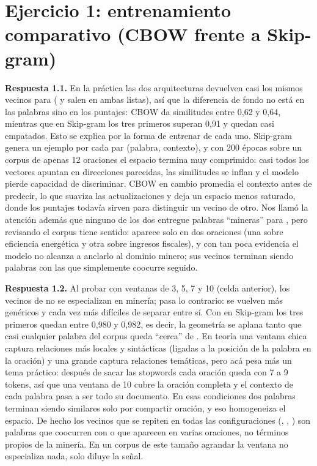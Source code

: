 \section{Ejercicio 1: entrenamiento comparativo (CBOW frente a Skip-gram)}

\textbf{Respuesta 1.1.} En la práctica las dos arquitecturas devuelven casi los mismos vecinos para  ( y  salen en ambas listas), así que la diferencia de fondo no está en las palabras sino en los puntajes: CBOW da similitudes entre 0,62 y 0,64, mientras que en Skip-gram los tres primeros superan 0,91 y quedan casi empatados. Esto se explica por la forma de entrenar de cada uno. Skip-gram genera un ejemplo por cada par (palabra, contexto), y con 200 épocas sobre un corpus de apenas 12 oraciones el espacio termina muy comprimido: casi todos los vectores apuntan en direcciones parecidas, las similitudes se inflan y el modelo pierde capacidad de discriminar. CBOW en cambio promedia el contexto antes de predecir, lo que suaviza las actualizaciones y deja un espacio menos saturado, donde los puntajes todavía sirven para distinguir un vecino de otro. Nos llamó la atención además que ninguno de los dos entregue palabras ``mineras'' para , pero revisando el corpus tiene sentido:  aparece solo en dos oraciones (una sobre eficiencia energética y otra sobre ingresos fiscales), y con tan poca evidencia el modelo no alcanza a anclarlo al dominio minero; sus vecinos terminan siendo palabras con las que simplemente coocurre seguido.

\textbf{Respuesta 1.2.} Al probar con ventanas de 3, 5, 7 y 10 (celda anterior), los vecinos de  no se especializan en minería; pasa lo contrario: se vuelven más genéricos y cada vez más difíciles de separar entre sí. Con  en Skip-gram los tres primeros quedan entre 0,980 y 0,982, es decir, la geometría se aplana tanto que casi cualquier palabra del corpus queda ``cerca'' de . En teoría una ventana chica captura relaciones más locales y sintácticas (ligadas a la posición de la palabra en la oración) y una grande captura relaciones temáticas, pero acá pesa más un tema práctico: después de sacar las stopwords cada oración queda con 7 a 9 tokens, así que una ventana de 10 cubre la oración completa y el contexto de cada palabra pasa a ser todo su documento. En esas condiciones dos palabras terminan siendo similares solo por compartir oración, y eso homogeneiza el espacio. De hecho los vecinos que se repiten en todas las configuraciones (, , ) son palabras que coocurren con  o que aparecen en varias oraciones, no términos propios de la minería. En un corpus de este tamaño agrandar la ventana no especializa nada, solo diluye la señal.

